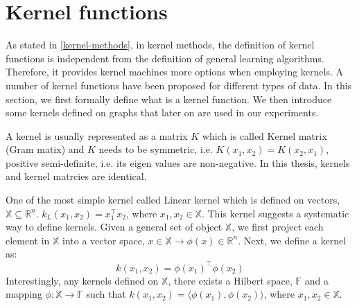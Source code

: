 \section{Kernel functions}
As stated in \ref{kernel-methods}, in kernel methods, the definition of kernel functions is independent from the definition of general learning algorithms. Therefore, it provides kernel machines more options when employing kernels. A number of kernel functions have been proposed for different types of data. In this section, we first formally define what is a kernel function. We then introduce some kernels defined on graphs that later on are used in our experiments.
A kernel is usually represented as a matrix $K$ which is called Kernel matrix (Gram matix) and $K$ needs to be symmetric, i.e. $K(x_1,x_2) = K(x_2,x_1)$, positive semi-definite, i.e. its eigen values are non-negative. In this thesis, kernels and kernel matrcies are identical. 

One of the most simple kernel called Linear kernel which is defined on vectors, $\mathbb{X} \subseteq \mathbb{R}^n$. $k_L(x_1, x_2) = x_{1}^\intercal x_2$, where $x_1, x_2 \in \mathbb{X}$. This kernel suggests a systematic way to define kernels. Given a general set of object $\mathbb{X}$, we first project each element in $\mathbb{X}$ into a vector space, $x \in \mathbb{X} \longrightarrow \phi(x) \in \mathbb{R}^n$. Next, we define a kernel as:
\begin{equation}
k(x_1, x_2) = \phi(x_1)^\intercal \phi(x_2)
\end{equation}
Interestingly, any kernels defined on $\mathbb{X}$, there exists a Hilbert space, $\mathbb{F}$ and a mapping $\phi: \mathbb{X}\longrightarrow \mathbb{F}$ such that $k(x_1, x_2)= \langle \phi(x_1),\phi(x_2) \rangle$, where $x_1, x_2 \in \mathbb{X}$.

